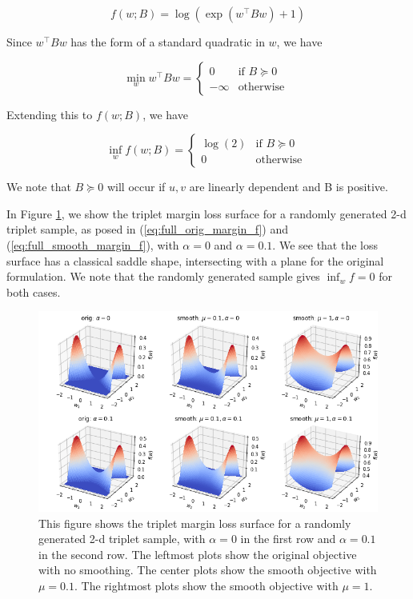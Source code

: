 \documentclass[11pt]{article}
\begin{document}
\begin{equation}
    f(w; B) = \log(\exp(w^{\top}Bw) + 1)
\end{equation}

Since $w^{\top}Bw$ has the form of a standard quadratic in $w$, we have

\begin{equation}
    \min_{w} w^{\top}Bw = \begin{cases} 
    0 &\mbox{if } B \succeq 0 \\
    -\infty & \mbox{otherwise } \end{cases}
\end{equation}

Extending this to $f(w; B)$, we have

\begin{equation}
    \inf_{w} f(w; B) = \begin{cases} 
    \log(2) &\mbox{if } B \succeq 0 \\
    0 & \mbox{otherwise } \end{cases}
\end{equation}

We note that $B \succeq 0$ will occur if $u, v$ are linearly dependent and B is positive.

In Figure \ref{fig:triplet_viz}, we show the triplet margin loss surface for a randomly generated 2-d triplet sample, as posed in (\ref{eq:full_orig_margin_f}) and (\ref{eq:full_smooth_margin_f}), with $\alpha=0$ and $\alpha=0.1$. We see that the loss surface has a classical saddle shape, intersecting with a plane for the original formulation. We note that the randomly generated sample gives $\inf_{w} f=0$ for both cases.

\begin{figure}
  \centering
  \includegraphics[width=\textwidth]{figures/triplet_viz.png}
  
  \caption{\label{fig:triplet_viz}This figure shows the triplet margin loss surface for a randomly generated 2-d triplet sample, with $\alpha = 0$ in the first row and $\alpha = 0.1$ in the second row. The leftmost plots show the original objective with no smoothing. The center plots show the smooth objective with $\mu=0.1$. The rightmost plots show the smooth objective with $\mu=1$. }
\end{figure}
\end{document}
